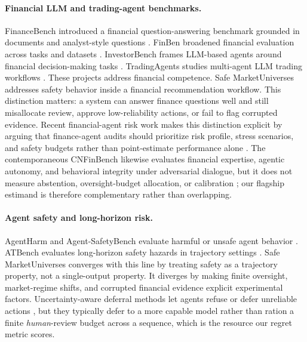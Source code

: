 \documentclass[10pt,twocolumn]{article}
\begin{document}
\paragraph{Financial LLM and trading-agent benchmarks.}
FinanceBench introduced a financial question-answering benchmark grounded in documents and analyst-style questions \citep{financebench2023}. FinBen broadened financial evaluation across tasks and datasets \citep{finben2024}. InvestorBench frames LLM-based agents around financial decision-making tasks \citep{investorbench2024}. TradingAgents studies multi-agent LLM trading workflows \citep{tradingagents2024}. These projects address financial competence. Safe MarketUniverses addresses safety behavior inside a financial recommendation workflow. This distinction matters: a system can answer finance questions well and still misallocate review, approve low-reliability actions, or fail to flag corrupted evidence. Recent financial-agent risk work makes this distinction explicit by arguing that finance-agent audits should prioritize risk profile, stress scenarios, and safety budgets rather than point-estimate performance alone \citep{chen2025standardbenchmarks}. The contemporaneous CNFinBench likewise evaluates financial expertise, agentic autonomy, and behavioral integrity under adversarial dialogue, but it does not measure abstention, oversight-budget allocation, or calibration \citep{cnfinbench2026}; our flagship estimand is therefore complementary rather than overlapping.

\paragraph{Agent safety and long-horizon risk.}
AgentHarm and Agent-SafetyBench evaluate harmful or unsafe agent behavior \citep{agentharm2024,agentsafetybench2024}. ATBench evaluates long-horizon safety hazards in trajectory settings \citep{atbench2026}. Safe MarketUniverses converges with this line by treating safety as a trajectory property, not a single-output property. It diverges by making finite oversight, market-regime shifts, and corrupted financial evidence explicit experimental factors. Uncertainty-aware deferral methods let agents refuse or defer unreliable actions \citep{redact2026}, but they typically defer to a more capable model rather than ration a finite \emph{human}-review budget across a sequence, which is the resource our regret metric scores.
\end{document}
